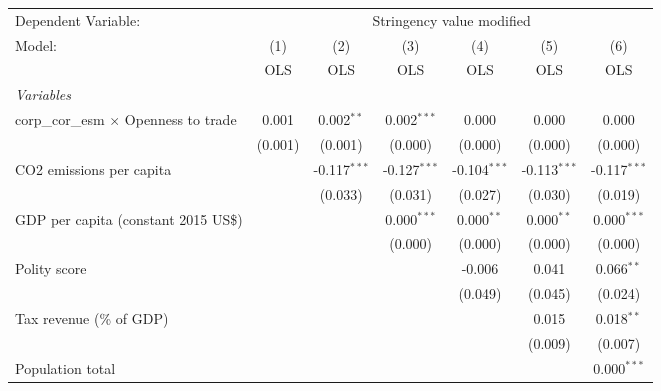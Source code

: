 
\begingroup
\centering
\begin{tabular}{lcccccc}
   \toprule
   Dependent Variable: & \multicolumn{6}{c}{Stringency value modified}\\
   Model:                                       & (1)     & (2)            & (3)            & (4)            & (5)            & (6)\\  
                                                &  OLS    & OLS            & OLS            & OLS            & OLS            & OLS\\  
   \midrule
   \emph{Variables}\\
   corp\_cor\_esm $\times$ Openness to trade    & 0.001   & 0.002$^{**}$   & 0.002$^{***}$  & 0.000          & 0.000          & 0.000\\   
                                                & (0.001) & (0.001)        & (0.000)        & (0.000)        & (0.000)        & (0.000)\\   
   CO2 emissions per capita                     &         & -0.117$^{***}$ & -0.127$^{***}$ & -0.104$^{***}$ & -0.113$^{***}$ & -0.117$^{***}$\\   
                                                &         & (0.033)        & (0.031)        & (0.027)        & (0.030)        & (0.019)\\   
   GDP per capita (constant 2015 US\$)          &         &                & 0.000$^{***}$  & 0.000$^{**}$   & 0.000$^{**}$   & 0.000$^{***}$\\   
                                                &         &                & (0.000)        & (0.000)        & (0.000)        & (0.000)\\   
   Polity score                                 &         &                &                & -0.006         & 0.041          & 0.066$^{**}$\\   
                                                &         &                &                & (0.049)        & (0.045)        & (0.024)\\   
   Tax revenue (\% of GDP)                      &         &                &                &                & 0.015          & 0.018$^{**}$\\   
                                                &         &                &                &                & (0.009)        & (0.007)\\   
   Population total                             &         &                &                &                &                & 0.000$^{***}$\\   

\end{tabular}
